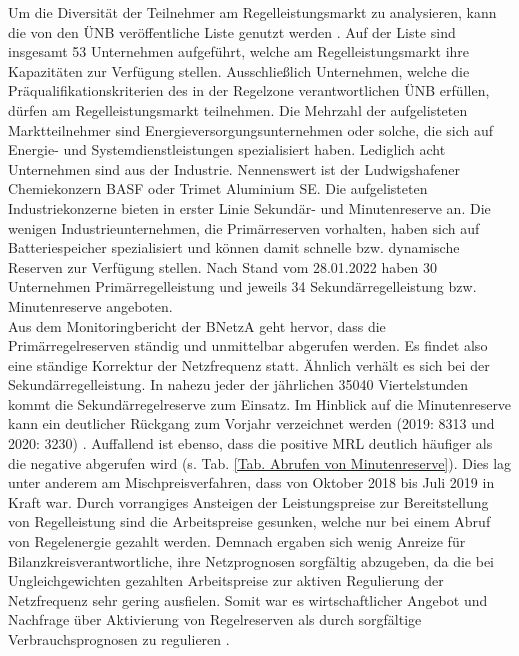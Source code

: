 			Um die Diversität der Teilnehmer am Regelleistungsmarkt zu analysieren, kann die von den ÜNB veröffentliche Liste genutzt werden \cite{regelleistungnet_PRL_Ausschreibung}.
			Auf der Liste sind insgesamt \num{53} Unternehmen aufgeführt, welche am Regelleistungsmarkt ihre Kapazitäten zur Verfügung stellen.
			Ausschließlich Unternehmen, welche die Präqualifikationskriterien des in der Regelzone verantwortlichen ÜNB erfüllen, dürfen am Regelleistungsmarkt teilnehmen.
			Die Mehrzahl der aufgelisteten Marktteilnehmer sind Energieversorgungsunternehmen oder solche, die sich auf Energie- und Systemdienstleistungen spezialisiert haben.
			Lediglich acht Unternehmen sind aus der Industrie.
			Nennenswert ist der Ludwigshafener Chemiekonzern BASF oder Trimet Aluminium SE.
			Die aufgelisteten Industriekonzerne bieten in erster Linie Sekundär- und Minutenreserve an.
			Die wenigen Industrieunternehmen, die Primärreserven vorhalten, haben sich auf Batteriespeicher spezialisiert und können damit schnelle bzw. dynamische Reserven zur Verfügung stellen.
			Nach Stand vom 28.01.2022 haben 30 Unternehmen Primärregelleistung und jeweils 34 Sekundärregelleistung bzw. Minutenreserve angeboten. \\
			
			Aus dem Monitoringbericht der BNetzA geht hervor, dass die Primärregelreserven ständig und unmittelbar abgerufen werden. 
			Es findet also eine ständige Korrektur der Netzfrequenz statt.
			Ähnlich verhält es sich bei der Sekundärregelleistung. 
			In nahezu jeder der jährlichen \num{35040} Viertelstunden kommt die Sekundärregelreserve zum Einsatz.
			Im Hinblick auf die Minutenreserve kann ein deutlicher Rückgang zum Vorjahr verzeichnet werden (2019: 8313 und 2020: 3230) \cite[S. 213 ff.]{Monitoringbericht_BNetzA}.
			Auffallend ist ebenso, dass die positive MRL deutlich häufiger als die negative abgerufen wird (s. Tab. \ref{Tab. Abrufen von Minutenreserve}).
			Dies lag unter anderem am Mischpreisverfahren, dass von Oktober 2018 bis Juli 2019 in Kraft war.
			Durch vorrangiges Ansteigen der Leistungspreise zur Bereitstellung von Regelleistung sind die Arbeitspreise gesunken, welche nur bei einem Abruf von Regelenergie gezahlt werden.
			Demnach ergaben sich wenig Anreize für Bilanzkreisverantwortliche, ihre Netzprognosen sorgfältig abzugeben, da die bei Ungleichgewichten gezahlten Arbeitspreise zur aktiven Regulierung der Netzfrequenz sehr gering ausfielen.
			Somit war es wirtschaftlicher Angebot und Nachfrage über Aktivierung von Regelreserven als durch sorgfältige Verbrauchsprognosen zu regulieren \cite[S. 215 f.]{Monitoringbericht_BNetzA}.
						
